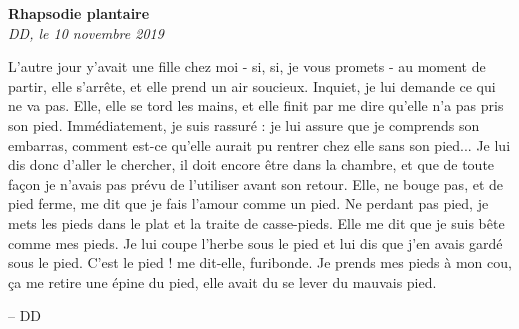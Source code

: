 \documentclass[french,12pt,amstex,a4paper]{article}
\begin{document}
\begin{center}
{\bf Rhapsodie plantaire}\\
{\it DD, le 10 novembre 2019}\\
\end{center}

L'autre jour y'avait une fille chez moi - si, si, je vous promets - au moment de partir, elle s'arrête, et elle prend un air soucieux. Inquiet, je lui demande ce qui ne va pas. Elle, elle se tord les mains, et elle finit par me dire qu'elle n'a pas pris son pied. Immédiatement, je suis rassuré : je lui assure que je comprends son embarras, comment est-ce qu'elle aurait pu rentrer chez elle sans son pied... Je lui dis donc d'aller le chercher, il doit encore être dans la chambre, et que de toute façon je n'avais pas prévu de l'utiliser avant son retour. Elle, ne bouge pas, et de pied ferme, me dit que je fais l'amour comme un pied. Ne perdant pas pied, je mets les pieds dans le plat et la traite de casse-pieds. Elle me dit que je suis bête comme mes pieds. Je lui coupe l'herbe sous le pied et lui dis que j'en avais gardé sous le pied. C'est le pied ! me dit-elle, furibonde. Je prends mes pieds à mon cou, ça me retire une épine du pied, elle avait du se lever du mauvais pied.

\begin{flushright}
-- DD
\end{flushright}
\end{document}
